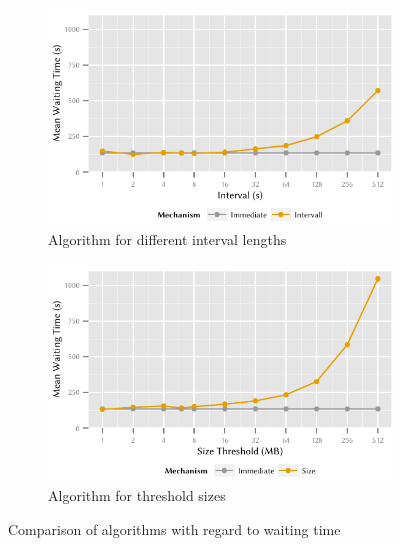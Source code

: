 \begin{figure}
	\begin{subfigure}[b]{\textwidth}
	\centering
	\includegraphics{application/cloud_file_synchronization/numerical_evaluation/figures/interval_delay}
	\caption{Algorithm \algointerval for different interval lengths}\label{fig:application:cloud_file_synchronisation:numerical_evaluation:waiting_time:waiting_time:interval}
	\end{subfigure} 
	\begin{subfigure}[b]{\textwidth}
	\centering
	\includegraphics{application/cloud_file_synchronization/numerical_evaluation/figures/size_delay}
	\caption{Algorithm \algosize for threshold sizes}\label{fig:application:cloud_file_synchronisation:numerical_evaluation:waiting_time:waiting_time:size}
	\end{subfigure}

	\caption{Comparison of algorithms with regard to waiting time \sojournTime}\label{fig:application:cloud_file_synchronisation:numerical_evaluation:waiting_time:waiting_time}
\end{figure}

